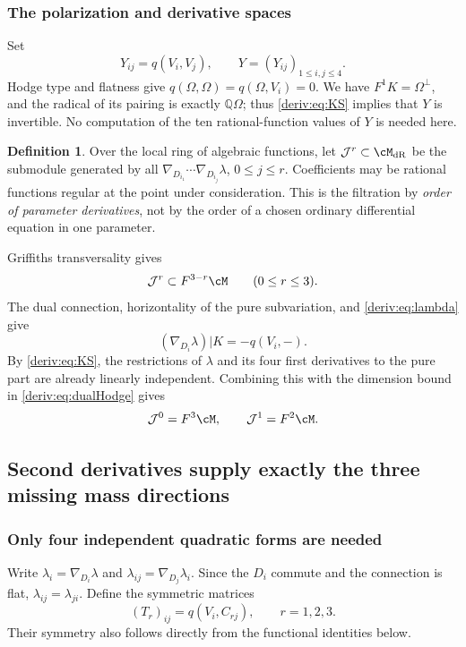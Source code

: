 \documentclass[11pt,a4paper,oneside]{article}
\theoremstyle{plain}
\theoremstyle{definition}
\newtheorem{definition}[theorem]{Definition}
\theoremstyle{remark}
\newcommand{\Q}{\mathbb Q}
\newcommand{\dR}{\mathrm{dR}}
\numberwithin{equation}{section}
\begin{document}
\subsubsection{The polarization and derivative spaces}
Set
\begin{equation}\label{deriv:eq:Y}
 Y_{ij}=q(V_i,V_j),\qquad Y=(Y_{ij})_{1\le i,j\le4}.
\end{equation}
Hodge type and flatness give $q(\Omega,\Omega)=q(\Omega,V_i)=0$.
We have $F^1K=\Omega^\perp$, and the radical of its pairing is exactly $\Q\Omega$; thus \eqref{deriv:eq:KS} implies that $Y$ is invertible.
No computation of the ten rational-function values of $Y$ is needed here.

\begin{definition}
Over the local ring of algebraic functions, let $\mathcal J^r\subset\cM_{\dR}$ be the submodule generated by all
$\nabla_{D_{i_1}}\cdots\nabla_{D_{i_j}}\lambda$, $0\le j\le r$.
Coefficients may be rational functions regular at the point under consideration.
This is the filtration by \emph{order of parameter derivatives}, not by the order of a chosen ordinary differential equation in one parameter.
\end{definition}

Griffiths transversality gives
\begin{equation}\label{deriv:eq:upper}
 \mathcal J^r\subset F^{3-r}\cM\qquad(0\le r\le3).
\end{equation}
The dual connection, horizontality of the pure subvariation, and \eqref{deriv:eq:lambda} give
\begin{equation}\label{deriv:eq:first}
 (\nabla_{D_i}\lambda)|K=-q(V_i,-).
\end{equation}
By \eqref{deriv:eq:KS}, the restrictions of $\lambda$ and its four first derivatives to the pure part are already linearly independent.
Combining this with the dimension bound in \eqref{deriv:eq:dualHodge} gives
\begin{equation}\label{deriv:eq:jet1}
 \mathcal J^0=F^3\cM,\qquad\mathcal J^1=F^2\cM.
\end{equation}


\subsection{Second derivatives supply exactly the three missing mass directions}
\subsubsection{Only four independent quadratic forms are needed}
Write $\lambda_i=\nabla_{D_i}\lambda$ and $\lambda_{ij}=\nabla_{D_j}\lambda_i$.
Since the $D_i$ commute and the connection is flat, $\lambda_{ij}=\lambda_{ji}$.
Define the symmetric matrices
\begin{equation}\label{deriv:eq:T}
 (T_r)_{ij}=q(V_i,C_{rj}),\qquad r=1,2,3.
\end{equation}
Their symmetry also follows directly from the functional identities below.
\end{document}
